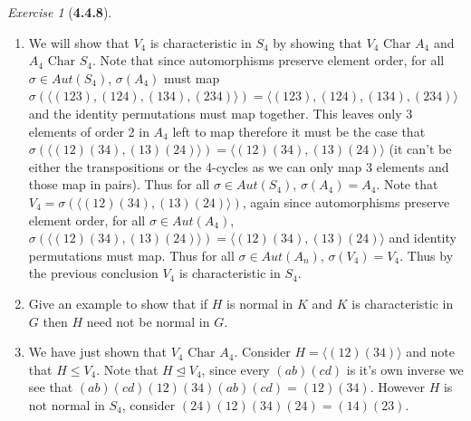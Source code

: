 \documentclass[12pt]{amsart}
\makeatletter
\theoremstyle{remark}
\newtheorem*{exercise}{Exercise}%
\renewenvironment{proof}[1][\proofname]{\par\doublespacing
  \pushQED{\qed}%
  \normalfont \topsep6\p@\@plus6\p@\relax
  \list{}{%
    \settowidth{\leftmargin}{\itshape\proofname:\hskip\labelsep}%
    \setlength{\labelwidth}{0pt}%
    \setlength{\itemindent}{-\leftmargin}%
  }%
  \item[\hskip\labelsep\itshape#1\@addpunct{:}]\ignorespaces
}{%
  \popQED\endlist\@endpefalse
  \singlespacing
}
\theoremstyle{mycomment}
\makeatother
\begin{document}
\begin{exercise}[\textbf{4.4.8}]
\begin{enumerate}
\begin{proof}
      We will show that $V_4$ is characteristic in $S_4$ by showing that $V_4\text{ Char }A_4$ and $A_4\text{ Char }S_4$. Note that since automorphisms preserve 
      element order, for all $\sigma \in Aut(S_4)$, $\sigma(A_4)$ must map $\sigma(\langle(123), (124), (134), (234) \rangle) = \langle(123), (124), (134), (234) \rangle$ and the identity permutations must map together. This 
      leaves only 3 elements of order 2 in $A_4$ left to map therefore it must be the case that $\sigma(\langle(12)(34), (13)(24)\rangle) = \langle(12)(34), (13)(24)\rangle$ (it can't be either the transpositions or the 4-cycles as we can only map 3 elements and those map in pairs). 
      Thus for all $\sigma \in Aut(S_4)$, $\sigma(A_4) = A_4$. Note that $V_4 = \sigma(\langle(12)(34), (13)(24)\rangle)$, again since automorphisms preserve element order, for all $\sigma \in Aut(A_4)$, $\sigma(\langle(12)(34), (13)(24)\rangle) = \langle(12)(34), (13)(24)\rangle$ and 
      identity permutations must map. Thus for all $\sigma \in Aut(A_n)$, $\sigma(V_4) = V_4$. Thus by the previous conclusion $V_4$ is characteristic in $S_4$. 
    \end{proof}


    \item[c.] Give an example to show that if $H$ is normal in $K$ and $K$ is characteristic in $G$ then $H$ need not be normal in $G$. \\
    \begin{proof}[Solution] We have just shown that $V_4 \text{ Char } A_4$. Consider $H = \langle (12)(34) \rangle$ and note that $H \leq V_4$. Note that 
      $H \trianglelefteq V_4$, since every $(ab)(cd)$ is it's own inverse we see that $(ab)(cd)(12)(34)(ab)(cd) = (12)(34)$. However $H$ is not normal in $S_4$, 
      consider $(24)(12)(34)(24) = (14)(23)$.   
    \end{proof}
  \end{enumerate}
\end{exercise}
\vspace{.15in}
\end{document}
